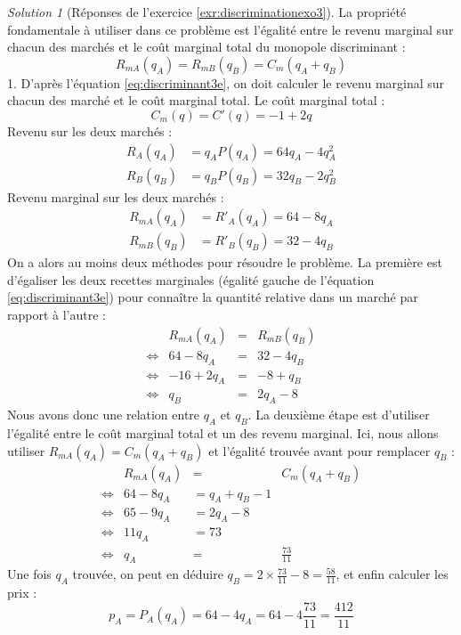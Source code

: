 \documentclass[
]{book}
\theoremstyle{definition}
\theoremstyle{definition}
\theoremstyle{definition}
\theoremstyle{definition}
\theoremstyle{remark}
\newtheorem*{solution}{Solution}
\begin{document}
\begin{solution}[Réponses de l'exercice \ref{exr:discriminationexo3}]
La propriété fondamentale à utiliser dans ce problème est l'égalité entre le revenu marginal sur chacun des marchés et le coût marginal total du monopole discriminant :
\begin{equation}
R_{mA}(q_A)=R_{mB}(q_B)=C_m(q_A+q_B) 
\label{eq:discriminant3e}
\end{equation}
1. D'après l'équation \eqref{eq:discriminant3e}, on doit calculer le revenu marginal sur chacun des marché et le coût marginal total.
Le coût marginal total :
\[C_m(q)=C'(q)=-1+2q\]
Revenu sur les deux marchés :
\[
\begin{array}{rl}
R_A(q_A)&=q_AP(q_A)=64q_A-4q_A^2\\
R_B(q_B)&=q_BP(q_B)=32q_B-2q_B^2
\end{array}
\]
Revenu marginal sur les deux marchés :
\[
\begin{array}{rl}
R_{mA}(q_A)&=R'_A(q_A)=64-8q_A\\
R_{mB}(q_B)&=R'_B(q_B)=32-4q_B
\end{array}
\]
On a alors au moins deux méthodes pour résoudre le problème.
La première est d'égaliser les deux recettes marginales (égalité gauche de l'équation \eqref{eq:discriminant3e}) pour connaître la quantité relative dans un marché par rapport à l'autre :
\[
\begin{array}{crcl}
&R_{mA}(q_A)&=&R_{mB}(q_B)\\
\Leftrightarrow&64-8q_A&=&32-4q_B\\
\Leftrightarrow&-16+2q_A&=&-8+q_B\\
\Leftrightarrow&q_B&=&2q_A-8
\end{array}
\]
Nous avons donc une relation entre \(q_A\) et \(q_B\).
La deuxième étape est d'utiliser l'égalité entre le coût marginal total et un des revenu marginal.
Ici, nous allons utiliser \(R_{mA}(q_A)=C_m(q_A+q_B)\) et l'égalité trouvée avant pour remplacer \(q_B\) :
\[
\begin{array}{crcl}
&R_{mA}(q_A)&=&C_m(q_A+q_B)\\
\Leftrightarrow&64-8q_A&=q_A+q_B-1\\
\Leftrightarrow&65-9q_A&=2q_A-8\\
\Leftrightarrow&11q_A&=73\\
\Leftrightarrow&q_A&=&\frac{73}{11}
\end{array}
\]
Une fois \(q_A\) trouvée, on peut en déduire \(q_B=2\times\frac{73}{11}-8=\frac{58}{11}\), et enfin calculer les prix :
\[p_A=P_A(q_A)=64-4q_A=64-4\frac{73}{11}=\frac{412}{11}\]

\end{solution}
\end{document}
